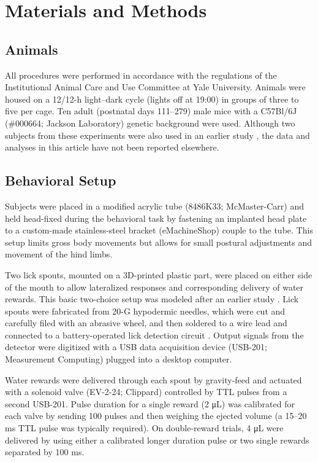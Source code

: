 \section{Materials and Methods}

\subsection*{Animals}
All procedures were performed in accordance with the regulations of the Institutional Animal Care and Use Committee at Yale University. Animals were housed on a 12/12-h light–dark cycle (lights off at 19:00) in groups of three to five per cage. Ten adult (postnatal days 111–279) male mice with a C57Bl/6J (\#000664; Jackson Laboratory) genetic background were used. Although two subjects from these experiments were also used in an earlier study \citep{siniscalchi2016fast}, the data and analyses in this article have not been reported elsewhere.

\subsection*{Behavioral Setup}
Subjects were placed in a modified acrylic tube (8486K33; McMaster-Carr) and held head-fixed during the behavioral task by fastening an implanted head plate to a custom-made stainless-steel bracket (eMachineShop) couple to the tube. This setup limits gross body movements but allows for small postural adjustments and movement of the hind limbs. 

Two lick spouts, mounted on a 3D-printed plastic part, were placed on either side of the mouth to allow lateralized responses and corresponding delivery of water rewards. This basic two-choice setup was modeled after an earlier study \citep{guo2014flow}. Lick spouts were fabricated from 20-G hypodermic needles, which were cut and carefully filed with an abrasive wheel, and then soldered to a wire lead and connected to a battery-operated lick detection circuit \citep{slotnick2009simple}. Output signals from the detector were digitized with a USB data acquisition device (USB-201; Measurement Computing) plugged into a desktop computer. 

Water rewards were delivered through each spout by gravity-feed and actuated with a solenoid valve (EV-2-24; Clippard) controlled by TTL pulses from a second USB-201. Pulse duration for a single reward (2 \si{\uL}) was calibrated for each valve by sending 100 pulses and then weighing the ejected volume (a 15–20 ms TTL pulse was typically required). On double-reward trials, 4 \si{\uL} were delivered by using either a calibrated longer duration pulse or two single rewards separated by 100 ms. 

